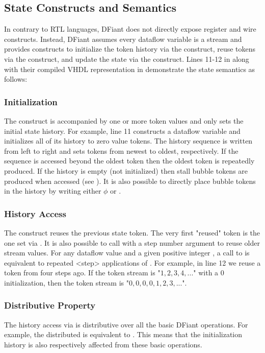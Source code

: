 \subsection{State Constructs and Semantics}
\label{sec:state_constructs}
In contrary to RTL languages, DFiant does not directly expose register and wire constructs. Instead, DFiant assumes every dataflow variable is a stream and provides constructs to initialize the token history via the  construct, reuse tokens via the  construct, and update the state via the \code{:=} construct. Lines 11-12 in  along with their compiled VHDL representation in  demonstrate the state semantics as follows:

\subsubsection{Initialization} The  construct is accompanied by one or more token values and only sets the initial state history. For example, line 11 constructs a dataflow variable and initializes all of its history to zero value tokens. The history sequence is written from left to right and sets tokens from newest to oldest, respectively. If the sequence is accessed beyond the oldest token then the oldest token is repeatedly produced. If the history is empty (not initialized) then stall bubble tokens are produced when accessed (see ). It is also possible to directly place bubble tokens in the history by writing either $\phi$ or .  

\subsubsection{History Access} The  construct reuses the previous state token. The very first "reused" token is the one set via . It is also possible to call  with a step number argument to reuse older stream values. For any dataflow value  and a given positive integer , a call to  is equivalent to repeated <step> applications of .
For example, in line 12 we reuse a  token from four steps ago. If the  token stream is "$1,2,3,4,...$" with a $0$ initialization, then the  token stream is "$0,0,0,0,1,2,3,...$".

\subsubsection{Distributive Property} The history access via  is distributive over all the basic DFiant operations. For example, the distributed  is equivalent to . This means that the initialization history is also respectively affected from these basic operations.
 
